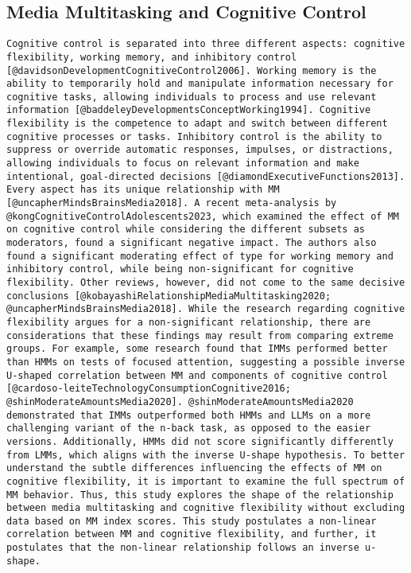 \documentclass[
  man]{apa7}
\begin{document}
\subsection{Media Multitasking and Cognitive Control}\label{media-multitasking-and-cognitive-control}

\begin{verbatim}
Cognitive control is separated into three different aspects: cognitive flexibility, working memory, and inhibitory control [@davidsonDevelopmentCognitiveControl2006]. Working memory is the ability to temporarily hold and manipulate information necessary for cognitive tasks, allowing individuals to process and use relevant information [@baddeleyDevelopmentsConceptWorking1994]. Cognitive flexibility is the competence to adapt and switch between different cognitive processes or tasks. Inhibitory control is the ability to suppress or override automatic responses, impulses, or distractions, allowing individuals to focus on relevant information and make intentional, goal-directed decisions [@diamondExecutiveFunctions2013]. Every aspect has its unique relationship with MM [@uncapherMindsBrainsMedia2018]. A recent meta-analysis by @kongCognitiveControlAdolescents2023, which examined the effect of MM on cognitive control while considering the different subsets as moderators, found a significant negative impact. The authors also found a significant moderating effect of type for working memory and inhibitory control, while being non-significant for cognitive flexibility. Other reviews, however, did not come to the same decisive conclusions [@kobayashiRelationshipMediaMultitasking2020; @uncapherMindsBrainsMedia2018]. While the research regarding cognitive flexibility argues for a non-significant relationship, there are considerations that these findings may result from comparing extreme groups. For example, some research found that IMMs performed better than HMMs on tests of focused attention, suggesting a possible inverse U-shaped correlation between MM and components of cognitive control [@cardoso-leiteTechnologyConsumptionCognitive2016; @shinModerateAmountsMedia2020]. @shinModerateAmountsMedia2020 demonstrated that IMMs outperformed both HMMs and LLMs on a more challenging variant of the n-back task, as opposed to the easier versions. Additionally, HMMs did not score significantly differently from LMMs, which aligns with the inverse U-shape hypothesis. To better understand the subtle differences influencing the effects of MM on cognitive flexibility, it is important to examine the full spectrum of MM behavior. Thus, this study explores the shape of the relationship between media multitasking and cognitive flexibility without excluding data based on MM index scores. This study postulates a non-linear correlation between MM and cognitive flexibility, and further, it postulates that the non-linear relationship follows an inverse u-shape.
\end{verbatim}
\end{document}
